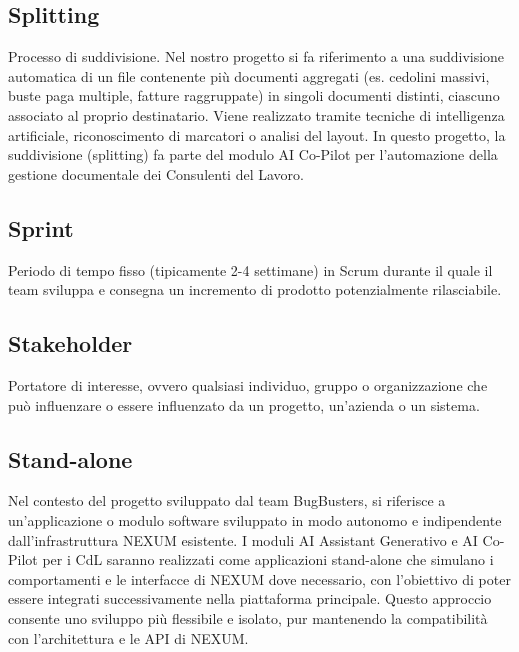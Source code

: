 \documentclass[a4paper,11pt]{article}
\begin{document}
\subsection{Splitting}
Processo di suddivisione. Nel nostro progetto si fa riferimento a una suddivisione automatica di un file contenente più documenti aggregati (es. cedolini massivi, buste paga multiple, fatture raggruppate) in singoli documenti distinti, ciascuno associato al proprio destinatario. Viene realizzato tramite tecniche di intelligenza artificiale, riconoscimento di marcatori o analisi del layout. In questo progetto, la suddivisione (splitting) fa parte del modulo AI Co-Pilot per l'automazione della gestione documentale dei Consulenti del Lavoro.





\subsection{Sprint}
Periodo di tempo fisso (tipicamente 2-4 settimane) in Scrum durante il quale il team sviluppa e consegna un incremento di prodotto potenzialmente rilasciabile.









\subsection{Stakeholder}
Portatore di interesse, ovvero qualsiasi individuo, gruppo o organizzazione che può influenzare o essere influenzato da un progetto, un'azienda o un sistema.









\subsection{Stand-alone}
Nel contesto del progetto sviluppato dal team BugBusters, si riferisce a un'applicazione o modulo software sviluppato in modo autonomo e indipendente dall'infrastruttura NEXUM esistente. I moduli AI Assistant Generativo e AI Co-Pilot per i CdL saranno realizzati come applicazioni stand-alone che simulano i comportamenti e le interfacce di NEXUM dove necessario, con l'obiettivo di poter essere integrati successivamente nella piattaforma principale. Questo approccio consente uno sviluppo più flessibile e isolato, pur mantenendo la compatibilità con l'architettura e le API di NEXUM.
\end{document}
